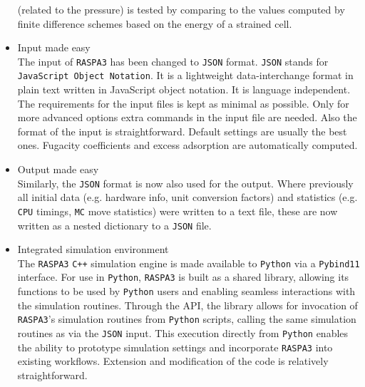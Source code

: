 \begin{itemize}
  (related to the pressure) is tested by comparing to the values computed by finite difference schemes 
  based on the energy of a strained cell.
  \item{Input made easy}\\
    The input of \texttt{RASPA3} has been changed to \texttt{JSON} format. 
    \texttt{JSON} stands for \texttt{JavaScript Object Notation}. It is a lightweight data-interchange format in plain text 
  written in JavaScript object notation. It is language independent.
  The requirements for the input files is kept as minimal as possible. 
  Only for more advanced options extra commands in the input file are
  needed. Also the format of the input is straightforward. Default settings are usually the best ones. 
  Fugacity coefficients and excess adsorption are automatically computed.
  \item{Output made easy}\\
    Similarly, the \texttt{JSON} format is now also used for the output. Where previously all initial data 
    (e.g. hardware info, unit conversion factors) and statistics (e.g. \texttt{CPU} timings, \texttt{MC} move statistics) 
    were written to a text file, these are now written as a nested dictionary to a \texttt{JSON} file.
  \item{Integrated simulation environment}\\
    The \texttt{RASPA3} \texttt{C++} simulation engine is made available to \texttt{Python} via a \texttt{Pybind11} interface. 
    For use in \texttt{Python}, \texttt{RASPA3} is built as a shared library, allowing its functions to be used by \texttt{Python}
  users and enabling seamless interactions with the simulation routines.
    Through the API, the library allows for invocation of \texttt{RASPA3}'s simulation routines from \texttt{Python} scripts, 
    calling the same simulation routines as via the \texttt{JSON} input. This execution directly from \texttt{Python} enables 
    the ability to prototype simulation settings and incorporate \texttt{RASPA3} into existing workflows.
  Extension and modification of the code is relatively straightforward.
\end{itemize}

